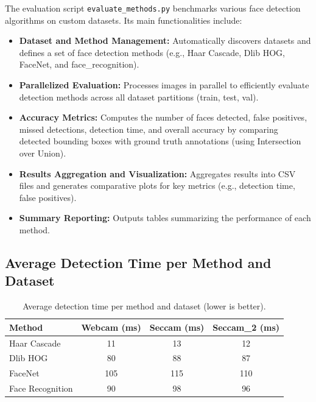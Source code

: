 The evaluation script \texttt{evaluate\_methods.py} benchmarks various face detection algorithms on custom datasets. Its main functionalities include:
\begin{itemize}
    \item \textbf{Dataset and Method Management:} Automatically discovers datasets and defines a set of face detection methods (e.g., Haar Cascade, Dlib HOG, FaceNet, and face\_recognition).
    \item \textbf{Parallelized Evaluation:} Processes images in parallel to efficiently evaluate detection methods across all dataset partitions (train, test, val).
    \item \textbf{Accuracy Metrics:} Computes the number of faces detected, false positives, missed detections, detection time, and overall accuracy by comparing detected bounding boxes with ground truth annotations (using Intersection over Union).
    \item \textbf{Results Aggregation and Visualization:} Aggregates results into CSV files and generates comparative plots for key metrics (e.g., detection time, false positives).
    \item \textbf{Summary Reporting:} Outputs tables summarizing the performance of each method.
\end{itemize}

\subsection{Average Detection Time per Method and Dataset}

\begin{table}[ht!]
    \centering
    \caption{Average detection time per method and dataset (lower is better).}
    \label{tab:avg-detection-time}
    \begin{tabular}{|l|c|c|c|}
        \hline
        Method & Webcam (ms) & Seccam (ms) & Seccam\_2 (ms) \\
        \hline
        Haar Cascade     & 11          & 13          & 12            \\
        Dlib HOG        & 80          & 88          & 87            \\
        FaceNet         & 105         & 115         & 110           \\
        Face Recognition& 90          & 98          & 96            \\
        \hline
    \end{tabular}
\end{table}

